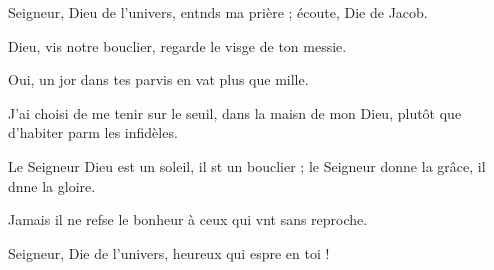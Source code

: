 \item Seigneur, Dieu de l’univers, entnds ma prière ;\psstar{} écoute, Die de Jacob.
\item Dieu, vis notre bouclier,\psstar{} regarde le visge de ton messie.
\item Oui, un jor dans tes parvis\psstar{} en vat plus que mille. 
\item J’ai choisi de me tenir sur le seuil, dans la maisn de mon Dieu,\psstar{} plutôt que d’habiter parm les infidèles.
\item Le Seigneur Dieu est un soleil, il st un bouclier ;\psstar{} le Seigneur donne la grâce, il dnne la gloire.
\item Jamais il ne refse le bonheur\psstar{} à ceux qui vnt sans reproche.
\item Seigneur, Die de l’univers,\psstar{} heureux qui espre en toi !